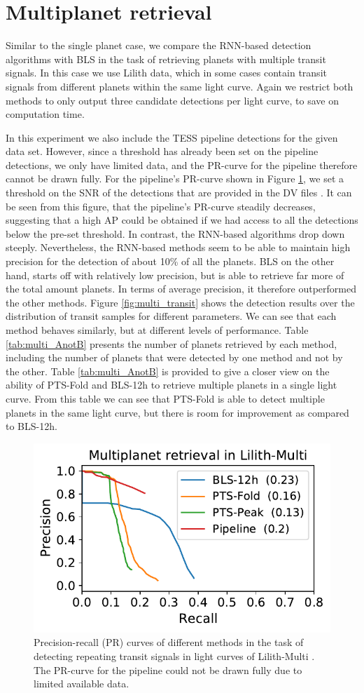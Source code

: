 \section{Multiplanet retrieval}
\label{sec:multis}

Similar to the single planet case, we compare the RNN-based detection algorithms with BLS in the task of retrieving planets with multiple transit signals. In this case we use Lilith data, which in some cases contain transit signals from different planets within the same light curve. Again we restrict both methods to only output three candidate detections per light curve, to save on computation time.

In this experiment we also include the TESS pipeline detections for the given data set. However, since a threshold has already been set on the pipeline detections, we only have limited data, and the PR-curve for the pipeline therefore cannot be drawn fully. For the pipeline's PR-curve shown in Figure \ref{fig:multi_pr}, we set a threshold on the SNR of the detections that are provided in the DV files . It can be seen from this figure, that the pipeline's PR-curve steadily decreases, suggesting that a high AP could be obtained if we had access to all the detections below the pre-set threshold. In contrast, the RNN-based algorithms drop down steeply. Nevertheless, the RNN-based methods seem to be able to maintain high precision for the detection of about 10\% of all the planets. BLS on the other hand, starts off with relatively low precision, but is able to retrieve far more of the total amount planets. In terms of average precision, it therefore outperformed the other methods. Figure \ref{fig:multi_transit} shows the detection results over the distribution of transit samples for different parameters. We can see that each method behaves similarly, but at different levels of performance. Table \ref{tab:multi_AnotB} presents the number of planets retrieved by each method, including the number of planets that were detected by one method and not by the other. Table \ref{tab:multi_AnotB} is provided to give a closer view on the ability of PTS-Fold and BLS-12h to retrieve multiple planets in a single light curve. From this table we can see that PTS-Fold is able to detect multiple planets in the same light curve, but there is room for improvement as compared to BLS-12h.

\begin{figure}
    \centering
    \includegraphics[width=0.35\linewidth]{Experiments/Figures/Multis/multi_pr.pdf}
    \caption{Precision-recall (PR) curves of different methods in the task of detecting repeating transit signals in light curves of Lilith-Multi . The PR-curve for the pipeline could not be drawn fully due to limited available data.}
    \label{fig:multi_pr}
\end{figure}

